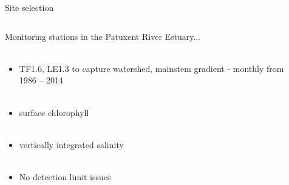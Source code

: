\documentclass[serif]{beamer}\usepackage[]{graphicx}\usepackage[]{color}
\begin{document}
\begin{frame}{Site selection}
\begin{columns}[T]
\begin{column}{0.45\textwidth}
Monitoring stations in the Patuxent River Estuary... \\~\\
\begin{itemize}
\item TF1.6, LE1.3 to capture watershed, mainstem gradient - monthly from 1986 -- 2014\\~\\
\item surface chlorophyll  \\~\\
\item vertically integrated salinity \\~\\
\item No detection limit issues
\end{itemize}
\end{column}
\begin{column}{0.45\textwidth}
\centerline{}
\end{column}
\end{columns}
\end{frame}
\end{document}
